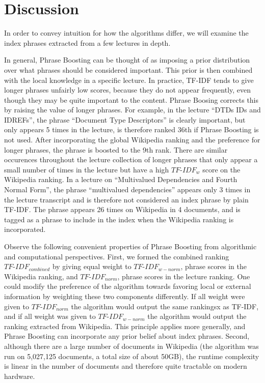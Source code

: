 \section{Discussion}
\label{sec:discussion}

In order to convey intuition for how the algorithms differ, we will
examine the index phrases extracted from a few lectures in depth.

In general, Phrase Boosting can be thought of as imposing a prior
distribution over what phrases should be considered important. This
prior is then combined with the local knowledge in a specific
lecture. In practice, TF-IDF tends to give longer phrases unfairly low
scores, because they do not appear frequently, even though they may be
quite important to the content. Phrase Boosing corrects this by
raising the value of longer phrases. For example, in the lecture
``DTDs IDs and IDREFs'', the phrase ``Document Type Descriptors'' is
clearly important, but only appears 5 times in the lecture, is
therefore ranked 36th if Phrase Boosting is not used. After
incorporating the global Wikipedia ranking and the preference for
longer phrases, the phrase is boosted to the 9th rank. There are
similar occurences throughout the lecture collection of longer phrases
that only appear a small number of times in the lecture but have a
high $TF\text{-}IDF_w$ score on the Wikipedia ranking. In a lecture on
``Multivalued Dependencies and Fourth Normal Form'', the phrase
``multivalued dependencies'' appears only 3 times in the lecture
transcript and is therefore not considered an index phrase by plain
TF-IDF. The phrase appears 26 times on Wikipedia in 4 documents, and
is tagged as a phrase to include in the index when the Wikipedia
ranking is incorporated.

Observe the following convenient properties of Phrase Boosting from
algorithmic and computational perspectives. First, we formed the
combined ranking $TF\text{-}IDF_{combined}$ by giving equal weight to
$TF\text{-}IDF_{w-norm}$, phrase scores in the Wikipedia ranking,
and $TF\text{-}IDF_{norm}$, phrase scores in the lecture
ranking. One could modify the preference of the algorithm towards
favoring local or external information by weighting these two
components differently. If all weight were given to
$TF\text{-}IDF_{norm}$ the algorithm would output the same rankingsx as
TF-IDF, and if all weight was given to $TF\text{-}IDF_{w-norm}$ the
algorithm would output the ranking extracted from Wikipedia. This
principle applies more generally, and Phrase Boosting can incorporate
any prior belief about index phrases. Second, although there are a large number of documents in Wikipedia (the algorithm was run on 5,027,125 documents, a total size of about 50GB), the runtime complexity is linear in the number of documents and therefore quite tractable on modern hardware.

